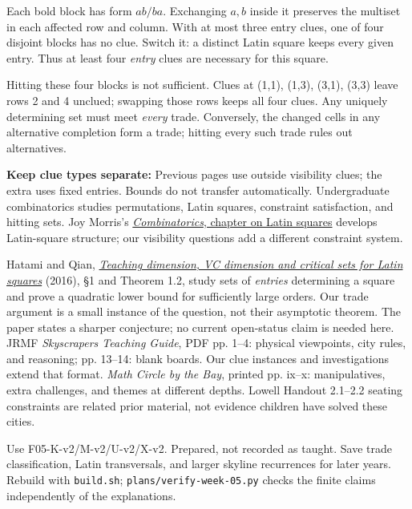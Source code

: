 \documentclass[11pt]{article}
\begin{document}
\newpage
{}
Each bold block has form \(ab/ba\). Exchanging \(a,b\) inside it preserves the multiset in each affected row and column. With at most three entry clues, one of four disjoint blocks has no clue. Switch it: a distinct Latin square keeps every given entry. Thus at least four \emph{entry} clues are necessary for this square.

Hitting these four blocks is not sufficient. Clues at (1,1), (1,3), (3,1), (3,3) leave rows 2 and 4 unclued; swapping those rows keeps all four clues. Any uniquely determining set must meet \emph{every} trade. Conversely, the changed cells in any alternative completion form a trade; hitting every such trade rules out alternatives.

\textbf{Keep clue types separate:} Previous pages use outside visibility clues; the extra uses fixed entries. Bounds do not transfer automatically.
Undergraduate combinatorics studies permutations, Latin squares, constraint satisfaction, and hitting sets. Joy Morris's \href{https://opentext.uleth.ca/Combinatorics/ch_Latin-squares.html}{\emph{Combinatorics}, chapter on Latin squares} develops Latin-square structure; our visibility questions add a different constraint system.

Hatami and Qian, \href{https://arxiv.org/html/1606.00032}{\emph{Teaching dimension, VC dimension and critical sets for Latin squares}} (2016), \S1 and Theorem 1.2, study sets of \emph{entries} determining a square and prove a quadratic lower bound for sufficiently large orders. Our trade argument is a small instance of the question, not their asymptotic theorem. The paper states a sharper conjecture; no current open-status claim is needed here.
JRMF \emph{Skyscrapers Teaching Guide}, PDF pp. 1--4: physical viewpoints, city rules, and reasoning; pp. 13--14: blank boards. Our clue instances and investigations extend that format. \emph{Math Circle by the Bay}, printed pp. ix--x: manipulatives, extra challenges, and themes at different depths. Lowell Handout 2.1--2.2 seating constraints are related prior material, not evidence children have solved these cities.

Use F05-K-v2/M-v2/U-v2/X-v2. Prepared, not recorded as taught. Save trade classification, Latin transversals, and larger skyline recurrences for later years. Rebuild with \texttt{build.sh}; \texttt{plans/verify-week-05.py} checks the finite claims independently of the explanations.
\end{document}
